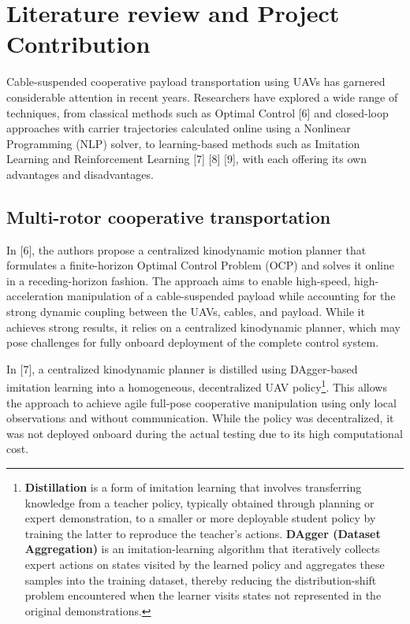 \chapter{\textbf{Literature review and Project Contribution}}

Cable-suspended cooperative payload transportation using UAVs has
garnered considerable attention in recent years. Researchers have
explored a wide range of techniques, from classical methods such as
Optimal Control [6] and closed-loop approaches with carrier trajectories 
calculated online using a Nonlinear Programming (NLP) solver, to 
learning-based methods such as Imitation Learning and Reinforcement Learning 
[7] [8] [9], with each offering its own advantages and disadvantages. 

\section{Multi-rotor cooperative transportation}

In [6], the authors propose a centralized kinodynamic
motion planner that formulates a finite-horizon Optimal Control Problem
(OCP) and solves it online in a receding-horizon fashion. The approach
aims to enable high-speed, high-acceleration manipulation of a
cable-suspended payload while accounting for the strong dynamic coupling
between the UAVs, cables, and payload. While it achieves strong results,
it relies on a centralized kinodynamic planner, which may pose challenges
for fully onboard deployment of the complete control system. 

In [7], a
centralized kinodynamic planner is distilled using DAgger-based imitation
learning into a homogeneous, decentralized UAV policy\footnote{\textbf{Distillation} is a form of imitation learning that involves transferring knowledge from a teacher policy, typically obtained through planning or expert demonstration, to a smaller or more deployable student policy by training the latter to reproduce the teacher's actions. \textbf{DAgger (Dataset Aggregation)} is an imitation-learning algorithm that iteratively collects expert actions on states visited by the learned policy and aggregates these samples into the training dataset, thereby reducing the distribution-shift problem encountered when the learner visits states not represented in the original demonstrations.}. This allows the
approach to achieve agile full-pose cooperative manipulation using only
local observations and without communication. While the policy was
decentralized, it was not deployed onboard during the actual testing due
to its high computational cost. 

